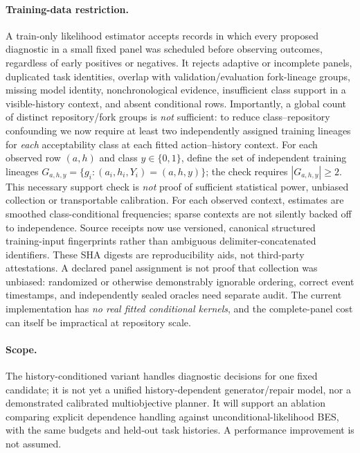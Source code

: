 \documentclass[pdflatex,sn-basic]{sn-jnl}
\begin{document}
\paragraph{Training-data restriction.}
A train-only likelihood estimator accepts records in
which every proposed diagnostic in a small fixed panel
was scheduled before observing outcomes, regardless of
early positives or negatives. It rejects adaptive or
incomplete panels, duplicated task identities, overlap
with validation/evaluation fork-lineage groups, missing
model identity, nonchronological evidence, insufficient
class support in a visible-history context, and absent
conditional rows. Importantly, a global count of distinct
repository/fork groups is \emph{not} sufficient: to
reduce class--repository confounding we now require
at least two independently assigned training lineages
for \emph{each} acceptability class at each fitted
action--history context. For each observed row $(a,h)$
and class $y\in\{0,1\}$, define the set of independent
training lineages
$G_{a,h,y}=\{g_i:(a_i,h_i,Y_i)=(a,h,y)\}$;
the check requires $|G_{a,h,y}|\ge2$.
This necessary support check is \emph{not}
proof of sufficient statistical power, unbiased
collection or transportable calibration. For each
observed context, estimates are smoothed
class-conditional frequencies; sparse contexts are
not silently backed off to independence. Source
receipts now use versioned, canonical structured
training-input fingerprints rather than ambiguous
delimiter-concatenated identifiers. These SHA digests
are reproducibility aids, not third-party attestations.
A declared panel assignment is not proof that collection
was unbiased: randomized or otherwise demonstrably
ignorable ordering, correct event timestamps, and
independently sealed oracles need separate audit.
The current implementation has \emph{no real fitted
conditional kernels}, and the complete-panel cost can
itself be impractical at repository scale.

\paragraph{Scope.}
The history-conditioned variant handles diagnostic
decisions for one fixed candidate; it is not yet a
unified history-dependent generator/repair model,
nor a demonstrated calibrated multiobjective planner.
It will support an ablation comparing explicit
dependence handling against unconditional-likelihood
BES, with the same budgets and held-out task histories.
A performance improvement is not assumed.
\end{document}
